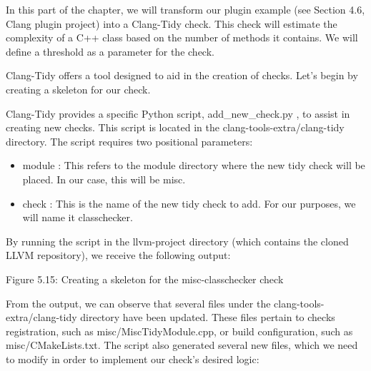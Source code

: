 
In this part of the chapter, we will transform our plugin example (see Section 4.6, Clang plugin project) into a Clang-Tidy check. This check will estimate the complexity of a C++ class based on the number of methods it contains. We will define a threshold as a parameter for the check.

Clang-Tidy offers a tool designed to aid in the creation of checks. Let's begin by creating a skeleton for our check.


Clang-Tidy provides a specific Python script, add\_new\_check.py , to assist in creating new checks. This script is located in the clang-tools-extra/clang-tidy directory. The script requires two positional parameters:

\begin{itemize}
\item
module : This refers to the module directory where the new tidy check will be placed. In our case, this will be misc.

\item
check : This is the name of the new tidy check to add. For our purposes, we will name it classchecker.
\end{itemize}

By running the script in the llvm-project directory (which contains the cloned LLVM repository), we receive the following output:


\begin{center}
Figure 5.15: Creating a skeleton for the misc-classchecker check
\end{center}

From the output, we can observe that several files under the clang-tools-extra/clang-tidy directory have been updated. These files pertain to checks registration, such as misc/MiscTidyModule.cpp, or build configuration, such as misc/CMakeLists.txt. The script also generated several new files, which we need to modify in order to implement our check's desired logic:

